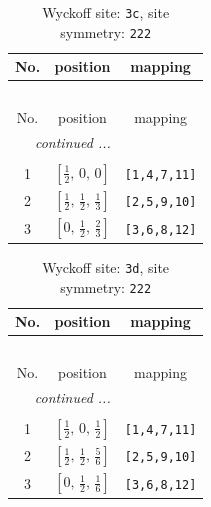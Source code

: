 \documentclass[fleqn,8pt]{jsarticle}
\begin{document}
\renewcommand{\arraystretch}{1.2}
\begin{longtable}{ccc}
\caption{Wyckoff site: {\tt 3c}, site symmetry: {\tt 222}}
 \\
 \hline \hline
No. & position & mapping \\ \hline \endfirsthead

\multicolumn{2}{l}{\tablename\ \thetable{}} \\
 \hline \hline
No. & position & mapping \\ \hline \endhead

 \hline \hline
\multicolumn{2}{r}{\footnotesize\it continued ...} \\ \endfoot

 \hline \hline
\multicolumn{2}{r}{} \\ \endlastfoot

1 & $\left[ \frac{1}{2},\, 0,\, 0 \right]$ & {\tt [1,4,7,11]} \\ \hline
2 & $\left[ \frac{1}{2},\, \frac{1}{2},\, \frac{1}{3} \right]$ & {\tt [2,5,9,10]} \\ \hline
3 & $\left[ 0,\, \frac{1}{2},\, \frac{2}{3} \right]$ & {\tt [3,6,8,12]} \\
\end{longtable}
\renewcommand{\arraystretch}{1.2}
\begin{longtable}{ccc}
\caption{Wyckoff site: {\tt 3d}, site symmetry: {\tt 222}}
 \\
 \hline \hline
No. & position & mapping \\ \hline \endfirsthead

\multicolumn{2}{l}{\tablename\ \thetable{}} \\
 \hline \hline
No. & position & mapping \\ \hline \endhead

 \hline \hline
\multicolumn{2}{r}{\footnotesize\it continued ...} \\ \endfoot

 \hline \hline
\multicolumn{2}{r}{} \\ \endlastfoot

1 & $\left[ \frac{1}{2},\, 0,\, \frac{1}{2} \right]$ & {\tt [1,4,7,11]} \\ \hline
2 & $\left[ \frac{1}{2},\, \frac{1}{2},\, \frac{5}{6} \right]$ & {\tt [2,5,9,10]} \\ \hline
3 & $\left[ 0,\, \frac{1}{2},\, \frac{1}{6} \right]$ & {\tt [3,6,8,12]} \\
\end{longtable}
\renewcommand{\arraystretch}{1.2}
\end{document}
